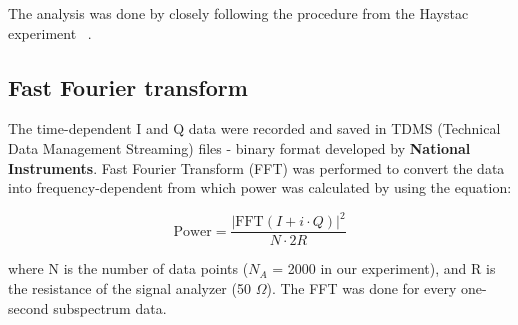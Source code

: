     The analysis was done by closely following the procedure from the Haystac experiment ~\cite{HAYSTACII}.

\subsection{Fast Fourier transform}
The time-dependent I and Q data were recorded and saved in TDMS (Technical Data Management Streaming) files - binary format developed by \textbf{National Instruments}.
Fast Fourier Transform (FFT) was performed to convert the data into frequency-dependent from which power was calculated by using the equation:

\begin{equation}
\label{eq:4.1}
    \text{Power} = \frac{|\text{FFT}(I+i \cdot Q)|^{2}}{N \cdot 2R}
\end{equation}

where N is the number of data points ($N_A $ = 2000 in our experiment), and R is the resistance of the signal analyzer (50 $\Omega$).
The FFT was done for every one-second subspectrum data.


